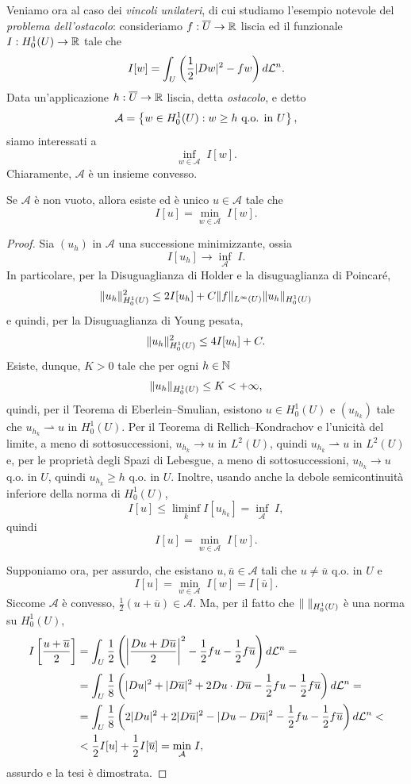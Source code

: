 Veniamo ora al caso dei \emph{vincoli unilateri}, di cui studiamo l'esempio notevole del \emph{problema dell'ostacolo}: consideriamo $f: \overline{U} \to \R$ liscia ed il funzionale $I: H^1_0(U) \to \R$ tale che
\[ I[w] = \int_U \left( \frac{1}{2}\abs{Dw}^2-fw\right)  d\mathcal{L}^n. \]
Data un'applicazione $h: \overline{U}\to \R$ liscia, detta \emph{ostacolo}, e detto
\[ \mathcal{A} = \left\lbrace w \in H^1_0(U): w \ge h \textup{ q.o. in } U\right\rbrace, \]
siamo interessati a 
\[ \underset{w \in \mathcal{A}}{\inf}\; I[w]. \]
Chiaramente, $\mathcal{A}$ è un insieme convesso.
\begin{teorema}
Se $\mathcal{A}$ è non vuoto, allora esiste ed è unico $u \in \mathcal{A}$ tale che 
\[ I[u] =  \underset{w \in \mathcal{A}}{\min}\; I[w]. \] 
\end{teorema}
\begin{proof}
Sia $(u_h)$ in $\mathcal{A}$ una successione minimizzante, ossia 
\[ I[u_h] \to \underset{\mathcal{A}}{\inf}\; I. \]
In particolare, per la Disuguaglianza di Holder e la disuguaglianza di Poincaré,
\[ \norm{u_h}_{H^1_0(U)}^2 \le 2I[u_h] + C\norm{f}_{L^\infty(U)}\norm{u_h}_{H^1_0(U)} \]
e quindi, per la Disuguaglianza di Young pesata,
\[ \norm{u_h}_{H^1_0(U)}^2 \le 4I[u_h] + C. \]
Esiste, dunque, $K>0$ tale che per ogni $h \in \N$
\[ \norm{u_h}_{H^1_0(U)} \le K <+\infty, \]
quindi, per il Teorema di Eberlein--Smulian, esistono $u \in H^1_0(U)$ e $(u_{h_k})$ tale che $u_{h_k} \rightharpoonup u$ in $H^1_0(U)$.
Per il Teorema di Rellich--Kondrachov e l'unicità del limite, a meno di sottosuccessioni, $u_{h_k} \to u$ in $L^2(U)$, quindi $u_{h_k} \rightharpoonup u$ in $L^2(U)$ e, per le proprietà degli Spazi di Lebesgue, a meno di sottosuccessioni, $u_{h_k} \to u$ q.o. in $U$, quindi $u_{h_k} \ge h$ q.o. in $U$. Inoltre, usando anche la debole semicontinuità inferiore della norma di $H^1_0(U)$, 
\[ I[u] \le \underset{k}{\liminf} I[u_{h_k}] = \underset{\mathcal{A}}{\inf}\; I, \]
quindi 
\[ I[u] =  \underset{w \in \mathcal{A}}{\min}\; I[w].  \]

Supponiamo ora, per assurdo, che esistano $u,\overline{u} \in \mathcal{A}$ tali che $u \ne \overline{u}$ q.o. in $U$ e 
\[ I[u] =  \underset{w \in \mathcal{A}}{\min}\; I[w] = I[\overline{u}]. \]
Siccome $\mathcal{A}$ è convesso, $\frac{1}{2}(u + \overline{u}) \in \mathcal{A}$. Ma, per il fatto che $\norm{\;}_{H^1_0(U)}$ è una norma su $H^1_0(U)$, 
\begin{align*}
I\left[ \frac{u+\overline{u}}{2}\right] &= \int_U \frac{1}{2} \left( \abs*{\frac{Du + D\overline{u}}{2}}^2 -\frac{1}{2}fu -\frac{1}{2}f\overline{u}\right) d\mathcal{L}^n = \\
&= \int_U \frac{1}{8}\left( \abs{Du}^2 + \abs{D\overline{u}}^2 +2Du\cdot D\overline{u} -\frac{1}{2}fu -\frac{1}{2}f\overline{u}\right) d\mathcal{L}^n = \\
&= \int_U \frac{1}{8}\left( 2\abs{Du}^2 + 2\abs{D\overline{u}}^2 -\abs{Du-D\overline{u}}^2 -\frac{1}{2}fu -\frac{1}{2}f\overline{u}\right) d\mathcal{L}^n < \\
&< \frac{1}{2}I[u] +  \frac{1}{2}I[\overline{u}] = \underset{\mathcal{A}}{\min}\; I,
\end{align*}
assurdo e la tesi è dimostrata.
\end{proof}
